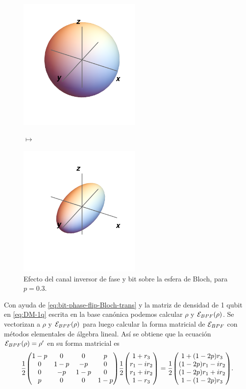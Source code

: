 \begin{figure}
\centering
\begin{minipage}{.4\textwidth}
    \centering
    \includegraphics[width=6cm]{images/bloch-ball}
\end{minipage}
$\longmapsto$
\begin{minipage}{0.4\textwidth}
    \centering
    \includegraphics[width=6cm]{images/bit-phase-flip}
\end{minipage}
\caption{Efecto del canal inversor de fase y bit sobre la esfera de Bloch, 
para $p=0.3$.}
\label{fig:bit-phase-flip}
\end{figure}
Con ayuda de \eqref{eq:bit-phase-flip-Bloch-trans} y la matriz
de densidad de 1 qubit en \eqref{eq:DM-1q} 
escrita en la base canónica podemos calcular 
$\rho$ y $\mathcal{E}_{BPF}\qty(\rho)$. Se vectorizan a $\rho$ y 
$\mathcal{E}_{BPF}\qty(\rho)$ para luego calcular la forma matricial 
de $\mathcal{E}_{BPF}$ con métodos elementales de álgebra lineal.
Así se obtiene que la ecuación $\mathcal{E}_{BPF}(\rho)=\rho'$ 
en su forma matricial es
\begin{align}
\frac{1}{2}
\mqty(
1-p & 0 & 0 & p \\
0 & 1-p & -p & 0 \\
0 & -p & 1-p & 0 \\
p & 0 & 0 & 1-p \\
)
\frac{1}{2}
\mqty(
1+r_3\\r_1-ir_2\\r_1+ir_2\\1-r_3
)
=
\frac{1}{2}
\mqty(
1+\qty(1-2p)r_3\\
\qty(1-2p)r_1-i r_2\\
\qty(1-2p)r_1+i r_2\\
1-\qty(1-2p)r_3
).
\label{eq:bpf-supero}
\end{align}
